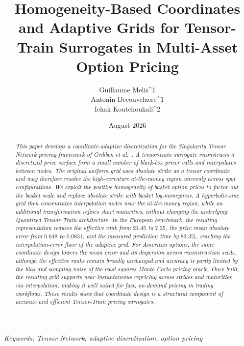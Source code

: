 \documentclass{article}
\title{Homogeneity-Based Coordinates and Adaptive Grids for Tensor-Train Surrogates in Multi-Asset Option Pricing}
\author{Guillaume Melis^1 \\Antonin Decouvelaere^1 \\Ichak Koutchoukali^2}
\date{August 2026}
\numberwithin{equation}{subsection}
\theoremstyle{definition}
\theoremstyle{remark}
\begin{document}
\maketitle
\textit{Keywords: Tensor Network, adaptive discretization, option pricing}
\begin{abstract}
\textit{This paper develops a coordinate-adaptive discretization for the Singularity
Tensor Network pricing framework of Gribben et al.\ \cite{Gribben2026STNGPR}. A tensor-train surrogate reconstructs a discretized price surface from a small number of black-box pricer calls and interpolates between nodes.
The original uniform grid uses absolute strike as a tensor coordinate and may
therefore resolve the high-curvature at-the-money region unevenly across spot
configurations. We exploit the positive homogeneity of basket-option prices to
factor out the basket scale and replace absolute strike with basket
log-moneyness. A hyperbolic-sine grid then concentrates interpolation nodes near
the at-the-money region, while an additional transformation refines short
maturities, without changing the underlying Quantized Tensor-Train
architecture. In the European benchmark, the resulting representation reduces
the effective rank from \(21.45\) to \(7.35\), the price mean absolute error from
\(0.648\) to \(0.0831\), and the measured prediction time by \(83.3\%\), reaching
the interpolation-error floor of the adaptive grid. For American options, the
same coordinate design lowers the mean error and its dispersion across
reconstruction seeds, although the effective ranks remain broadly unchanged
and accuracy is partly limited by the bias and sampling noise of the least-squares
Monte Carlo pricing oracle. Once built, the resulting grid supports near-instantaneous repricing across strikes and maturities via interpolation, making it well suited for fast, on-demand pricing in trading workflows. These results show that coordinate design is a
structural component of accurate and efficient Tensor-Train pricing surrogates.}
\end{abstract}

\newpage
\end{document}
